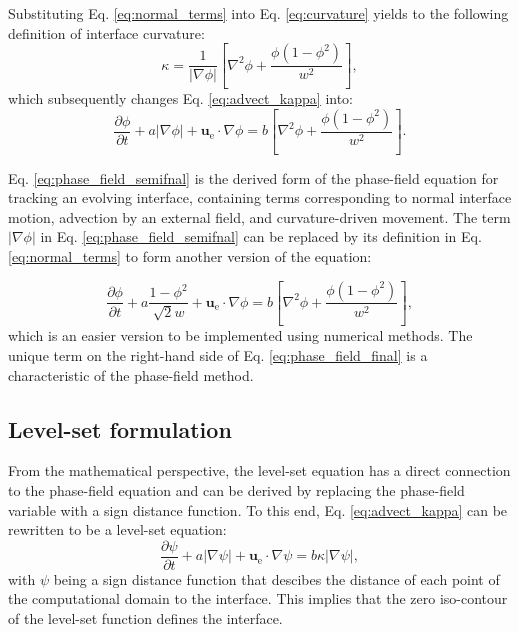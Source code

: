 Substituting Eq. \ref{eq:normal_terms} into Eq. \ref{eq:curvature} yields to the following definition of interface curvature:
\begin{equation}
\kappa=\frac{1}{|\nabla \phi|}\left[\nabla^{2} \phi+\frac{\phi\left(1-\phi^{2}\right)}{w^{2}}\right],
\end{equation}
which subsequently changes Eq. \ref{eq:advect_kappa} into:
\begin{equation} \label{eq:phase_field_semifnal}
\frac{\partial \phi}{\partial t}+a|\nabla \phi|+\boldsymbol{u}_{\mathrm{e}} \cdot \nabla \phi=b\left[\nabla^{2} \phi+\frac{\phi\left(1-\phi^{2}\right)}{w^{2}}\right].
\end{equation}

Eq. \ref{eq:phase_field_semifnal} is the derived form of the phase-field equation for tracking an evolving interface, containing terms corresponding to normal interface motion, advection by an external field, and curvature-driven movement. The term $|\nabla \phi|$ in Eq. \ref{eq:phase_field_semifnal} can be replaced by its definition in Eq. \ref{eq:normal_terms} to form another version of the equation:

\begin{equation} \label{eq:phase_field_final}
\frac{\partial \phi}{\partial t}+a \frac{1-\phi^{2}}{\sqrt{2} w}+\boldsymbol{u}_{\mathrm{e}} \cdot \nabla \phi=b\left[\nabla^{2} \phi+\frac{\phi\left(1-\phi^{2}\right)}{w^{2}}\right],
\end{equation}
which is an easier version to be implemented using numerical methods. The unique term on the right-hand side of Eq. \ref{eq:phase_field_final} is a characteristic of the phase-field method.

\subsection{Level-set formulation}

From the mathematical perspective, the level-set equation has a direct connection to the phase-field equation and can be derived by replacing the phase-field variable with a sign distance function. To this end, Eq. \ref{eq:advect_kappa} can be rewritten to be a level-set equation:
\begin{equation} \label{eq:ls_general}
\frac{\partial \psi}{\partial t}+a|\nabla \psi|+\boldsymbol{u}_{\mathrm{e}} \cdot \nabla \psi=b \kappa|\nabla \psi|,
\end{equation}
with $\psi$ being a sign distance function that descibes the distance of each point of the computational domain to the interface. This implies that the zero iso-contour of the level-set function defines the interface.

